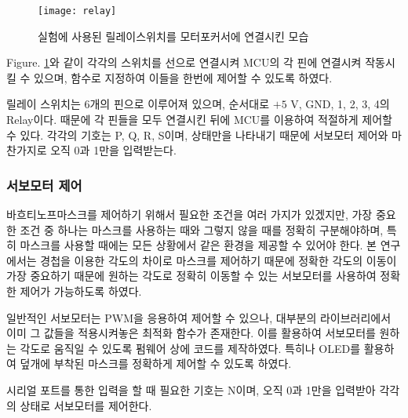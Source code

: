\begin{figure}[h]
	\begin{center}
		\texttt{[image: relay]}
	\end{center}
	\caption{실험에 사용된 릴레이스위치를 모터포커서에 연결시킨 모습}
	\label{relay}
\end{figure}


\textrm{Figure}. \ref{relay}와 같이 각각의 스위치를 선으로 연결시켜 MCU의 각 핀에 연결시켜 작동시킬 수 있으며, 함수로 지정하여 이들을 한번에 제어할 수 있도록 하였다.

릴레이 스위치는 6개의 핀으로 이루어져 있으며, 순서대로 $\textrm{+5 V}$, GND, 1, 2, 3, 4의 Relay이다. 때문에 각 핀들을 모두 연결시킨 뒤에 MCU를 이용하여 적절하게 제어할 수 있다. 각각의 기호는 P, Q, R, S이며, 상태만을 나타내기 때문에 서보모터 제어와 마찬가지로 오직 0과 1만을 입력받는다.



\subsubsection{서보모터 제어}
바흐티노프마스크를 제어하기 위해서 필요한 조건을 여러 가지가 있겠지만, 가장 중요한 조건 중 하나는 마스크를 사용하는 때와 그렇지 않을 때를 정확히 구분해야하며, 특히 마스크를 사용할 때에는 모든 상황에서 같은 환경을 제공할 수 있어야 한다. 본 연구에서는 경첩을 이용한 각도의 차이로 마스크를 제어하기 때문에 정확한 각도의 이동이 가장 중요하기 때문에 원하는 각도로 정확히 이동할 수 있는 서보모터를 사용하여 정확한 제어가 가능하도록 하였다.

일반적인 서보모터는 PWM을 응용하여 제어할 수 있으나, 대부분의 라이브러리에서 이미 그 값들을 적용시켜놓은 최적화 함수가 존재한다. 이를 활용하여 서보모터를 원하는 각도로 움직일 수 있도록 펌웨어 상에 코드를 제작하였다. 특히나 OLED를 활용하여 덮개에 부착된 마스크를 정확하게 제어할 수 있도록 하였다.

시리얼 포트를 통한 입력을 할 때 필요한 기호는 N이며, 오직 0과 1만을 입력받아 각각의 상태로 서보모터를 제어한다.



